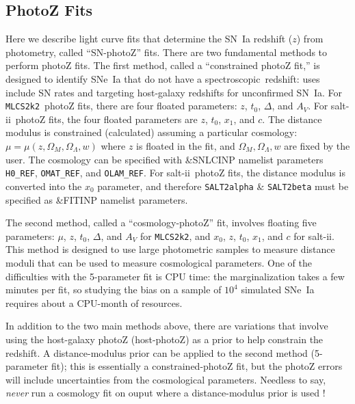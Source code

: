 \documentclass[12pt]{article}
\newcommand{\mlcs}{{\tt MLCS2k2}}
\newcommand{\SALTII}{{\sc salt-ii}}
\newcommand{\spec}{spectroscopic}
\newcommand{\OM}{\Omega_M}
\newcommand{\OL}{\Omega_{\Lambda}}
\begin{document}
   \clearpage
   \subsection{PhotoZ Fits}
   \label{subsec:photoz}

Here we describe light curve fits that determine the
SN~Ia redshift ($z$) from photometry, called ``SN-photoZ'' fits.
There are two fundamental methods to perform photoZ fits.
The first method, called a ``constrained photoZ fit,'' 
is designed to identify SNe~Ia that do not have
a \spec\ redshift: uses include SN rates and targeting
host-galaxy redshifts for unconfirmed SN~Ia.
For \mlcs\ photoZ fits, there are four floated
parameters: $z$, $t_0$, $\Delta$, and $A_V$.
For \SALTII\ photoZ fits, the four floated parameters are
$z$, $t_0$, $x_1$, and $c$.
%
The distance modulus is constrained (calculated)
assuming a particular cosmology: $\mu = \mu(z,\OM,\OL,w)$
where $z$ is floated in the fit, and $\OM,\OL,w$ are
fixed by the user.  The cosmology can be specified
with \&SNLCINP namelist parameters
{\tt H0\_REF}, {\tt OMAT\_REF}, and {\tt OLAM\_REF}.
For \SALTII\ photoZ fits, the distance modulus is converted
into the $x_0$ parameter, and therefore 
{\tt SALT2alpha} \& {\tt SALT2beta} must be specified
as \&FITINP namelist parameters.

The second method, called a ``cosmology-photoZ'' fit,
involves floating five parameters:
$\mu$, $z$, $t_0$, $\Delta$, and $A_V$ for \mlcs, and
$x_0$, $z$, $t_0$, $x_1$, and $c$ for \SALTII.
This method is designed to use large photometric samples
to measure distance moduli that can be used to measure
cosmological parameters. One of the difficulties with
the 5-parameter fit is CPU time:
the marginalization takes a few minutes per fit,
so studying the bias on a sample of $10^4$ simulated
SNe~Ia requires about a CPU-month of resources.

In addition to the two main methods above, there are
variations that involve using the host-galaxy photoZ
(host-photoZ) as a prior to help constrain the redshift.
A distance-modulus prior can be applied to the second
method (5-parameter fit); this is essentially a
constrained-photoZ fit, but the photoZ errors will include 
uncertainties from the cosmological parameters.
Needless to say, {\it never} run a cosmology fit
on ouput where a distance-modulus prior is used !
\end{document}

